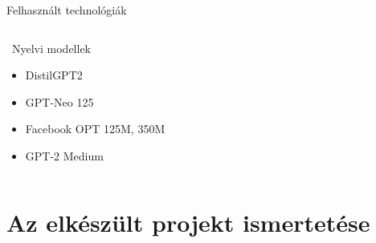 \documentclass[aspectratio=169, 11pt]{beamer}
\begin{document}
\begin{frame}{Felhasznált technológiák}
\begin{columns}[T]
\begin{block}{\faRobot~Nyelvi modellek}
        \begin{itemize}
          \item DistilGPT2
          \item GPT-Neo 125
          \item Facebook OPT 125M, 350M
          \item GPT-2 Medium
        \end{itemize}
      \end{block}
    \end{columns}
   		
\end{frame}

\section{Az elkészült projekt ismertetése}
\end{document}
